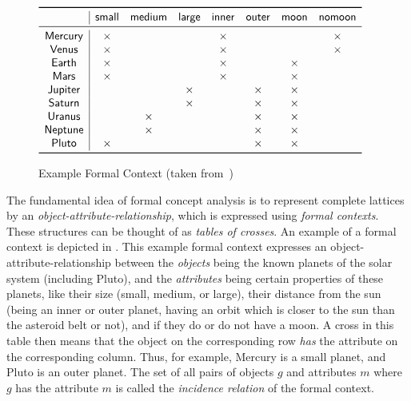 \begin{figure}[tp]
  \centering
  \begin{math}
    \begin{array}[c]{c|*{7}{c}}
      \toprule
      ~       & \mathsf{small} & \mathsf{medium} & \mathsf{large} & \mathsf{inner} &
      \mathsf{outer} & \mathsf{moon} & \mathsf{no moon} \\
      \midrule
      \mathsf{Mercury} & \times &   &   & \times &   &   & \times  \\
      \mathsf{Venus}   & \times &   &   & \times &   &   & \times  \\
      \mathsf{Earth}   & \times &   &   & \times &   & \times &    \\
      \mathsf{Mars}    & \times &   &   & \times &   & \times &    \\
      \mathsf{Jupiter} &   &   & \times &   & \times & \times &    \\
      \mathsf{Saturn}  &   &   & \times &   & \times & \times &    \\
      \mathsf{Uranus}  &   & \times &   &   & \times & \times &    \\
      \mathsf{Neptune} &   & \times &   &   & \times & \times &    \\
      \mathsf{Pluto}   & \times &   &   &   & \times & \times &    \\
      \bottomrule
    \end{array}
  \end{math}
  \caption{Example Formal Context (taken from~\cite{fca:Wille:1982})}
  \label{fig:example-formal-context}
\end{figure}

The fundamental idea of formal concept analysis is to represent complete lattices by an
\emph{object-attribute-relationship}, which is expressed using \emph{formal contexts}.
These structures can be thought of as \emph{tables of crosses}.  An example of a formal
context is depicted in .  This example formal context
expresses an object-attribute-relationship between the \emph{objects} being the known
planets of the solar system (including Pluto), and the \emph{attributes} being certain
properties of these planets, like their size (\textsf{small}, \textsf{medium}, or
\textsf{large}), their distance from the sun (being an \textsf{inner} or \textsf{outer}
planet, \ie having an orbit which is closer to the sun than the asteroid belt or not), and
if they do or do not have a \textsf{moon}.  A cross in this table then means that the
object on the corresponding row \emph{has} the attribute on the corresponding column.
Thus, for example, \textsf{Mercury} is a \textsf{small} planet, and \textsf{Pluto} is an
\textsf{outer} planet.  The set of all pairs of objects $g$ and attributes $m$ where $g$
has the attribute $m$ is called the \emph{incidence relation} of the formal context.

